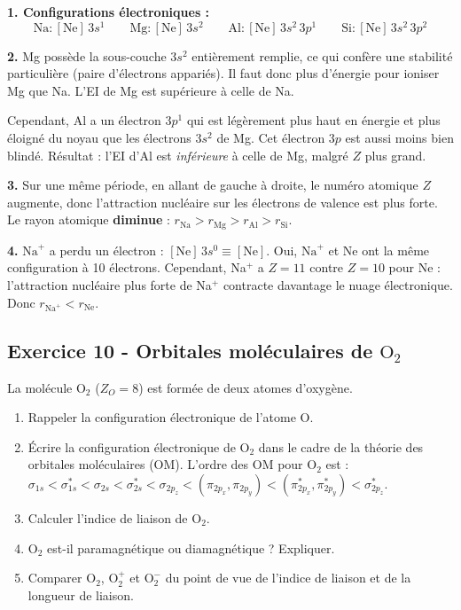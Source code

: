 \documentclass[12pt,a4paper]{article}
\begin{document}
\begin{boitecorrige}
\textbf{1. Configurations électroniques :}
\[
\text{Na} : [\text{Ne}]\,3s^1 \qquad \text{Mg} : [\text{Ne}]\,3s^2 \qquad \text{Al} : [\text{Ne}]\,3s^2\,3p^1 \qquad \text{Si} : [\text{Ne}]\,3s^2\,3p^2
\]

\textbf{2.} Mg possède la sous-couche $3s^2$ entièrement remplie, ce qui confère une stabilité particulière (paire d'électrons appariés). Il faut donc plus d'énergie pour ioniser Mg que Na. L'EI de Mg est supérieure à celle de Na.

Cependant, Al a un électron $3p^1$ qui est légèrement plus haut en énergie et plus éloigné du noyau que les électrons $3s^2$ de Mg. Cet électron $3p$ est aussi moins bien blindé. Résultat : l'EI d'Al est \textit{inférieure} à celle de Mg, malgré $Z$ plus grand.

\textbf{3.} Sur une même période, en allant de gauche à droite, le numéro atomique $Z$ augmente, donc l'attraction nucléaire sur les électrons de valence est plus forte. Le rayon atomique \textbf{diminue} : $r_{\text{Na}} > r_{\text{Mg}} > r_{\text{Al}} > r_{\text{Si}}$.

\textbf{4.} $\text{Na}^+$ a perdu un électron : $[\text{Ne}]\,3s^0 \equiv [\text{Ne}]$. Oui, $\text{Na}^+$ et Ne ont la même configuration à 10 électrons. Cependant, Na$^+$ a $Z=11$ contre $Z=10$ pour Ne : l'attraction nucléaire plus forte de Na$^+$ contracte davantage le nuage électronique. Donc $r_{\text{Na}^+} < r_{\text{Ne}}$.
\end{boitecorrige}

\subsection*{Exercice 10 - Orbitales moléculaires de $\text{O}_2$ \niveau{\difficile}}

\begin{boiteexercice}
La molécule $\text{O}_2$ ($Z_O = 8$) est formée de deux atomes d'oxygène.
\begin{enumerate}
  \item Rappeler la configuration électronique de l'atome O.
  \item Écrire la configuration électronique de $\text{O}_2$ dans le cadre de la théorie des orbitales moléculaires (OM). L'ordre des OM pour $\text{O}_2$ est :
  $\sigma_{1s} < \sigma^*_{1s} < \sigma_{2s} < \sigma^*_{2s} < \sigma_{2p_z} < (\pi_{2p_x},\pi_{2p_y}) < (\pi^*_{2p_x},\pi^*_{2p_y}) < \sigma^*_{2p_z}$.
  \item Calculer l'indice de liaison de $\text{O}_2$.
  \item $\text{O}_2$ est-il paramagnétique ou diamagnétique ? Expliquer.
  \item Comparer $\text{O}_2$, $\text{O}_2^+$ et $\text{O}_2^-$ du point de vue de l'indice de liaison et de la longueur de liaison.
\end{enumerate}
\end{boiteexercice}
\end{document}
